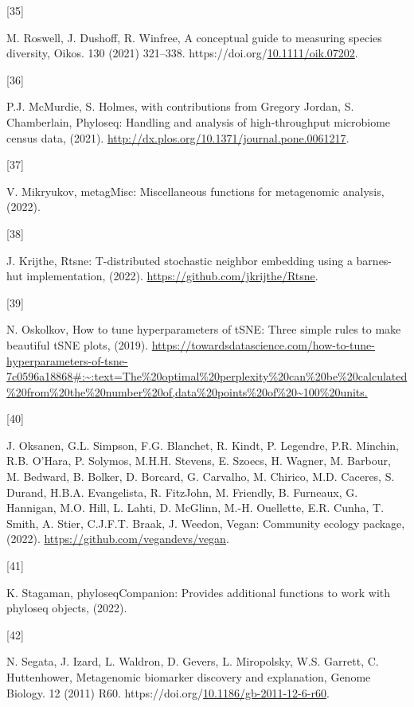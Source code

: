\documentclass[preprint,3p,
a4paper]{elsarticle} %
\newlength{\cslhangindent}
\newlength{\csllabelwidth}
\newlength{\cslentryspacingunit} %
\newenvironment{CSLReferences}[2] %
 {%
  \setlength{\parindent}{0pt}
  \ifodd #1
  \let\oldpar\par
  \def\par{\hangindent=\cslhangindent\oldpar}
  \fi
  \setlength{\parskip}{#2\cslentryspacingunit}
 }%
 {}
\newcommand{\CSLLeftMargin}[1]{\parbox[t]{\csllabelwidth}{#1}}
\newcommand{\CSLRightInline}[1]{\parbox[t]{\linewidth - \csllabelwidth}{#1}\break}
\begin{document}
\begin{CSLReferences}{0}{0}
\leavevmode{}%
\CSLLeftMargin{{[}35{]} }%
\CSLRightInline{M. Roswell, J. Dushoff, R. Winfree, A conceptual guide
to measuring species diversity, Oikos. 130 (2021) 321--338.
https://doi.org/\href{https://doi.org/10.1111/oik.07202}{10.1111/oik.07202}.}

\leavevmode{}%
\CSLLeftMargin{{[}36{]} }%
\CSLRightInline{P.J. McMurdie, S. Holmes, with contributions from
Gregory Jordan, S. Chamberlain, Phyloseq: Handling and analysis of
high-throughput microbiome census data, (2021).
\url{http://dx.plos.org/10.1371/journal.pone.0061217}.}

\leavevmode{}%
\CSLLeftMargin{{[}37{]} }%
\CSLRightInline{V. Mikryukov, metagMisc: Miscellaneous functions for
metagenomic analysis, (2022).}

\leavevmode{}%
\CSLLeftMargin{{[}38{]} }%
\CSLRightInline{J. Krijthe, Rtsne: T-distributed stochastic neighbor
embedding using a barnes-hut implementation, (2022).
\url{https://github.com/jkrijthe/Rtsne}.}

\leavevmode{}%
\CSLLeftMargin{{[}39{]} }%
\CSLRightInline{N. Oskolkov, How to tune hyperparameters of tSNE: Three
simple rules to make beautiful tSNE plots, (2019).
\url{https://towardsdatascience.com/how-to-tune-hyperparameters-of-tsne-7c0596a18868\#:~:text=The\%20optimal\%20perplexity\%20can\%20be\%20calculated\%20from\%20the\%20number\%20of,data\%20points\%20of\%20~100\%20units.}}

\leavevmode{}%
\CSLLeftMargin{{[}40{]} }%
\CSLRightInline{J. Oksanen, G.L. Simpson, F.G. Blanchet, R. Kindt, P.
Legendre, P.R. Minchin, R.B. O'Hara, P. Solymos, M.H.H. Stevens, E.
Szoecs, H. Wagner, M. Barbour, M. Bedward, B. Bolker, D. Borcard, G.
Carvalho, M. Chirico, M.D. Caceres, S. Durand, H.B.A. Evangelista, R.
FitzJohn, M. Friendly, B. Furneaux, G. Hannigan, M.O. Hill, L. Lahti, D.
McGlinn, M.-H. Ouellette, E.R. Cunha, T. Smith, A. Stier, C.J.F.T.
Braak, J. Weedon, Vegan: Community ecology package, (2022).
\url{https://github.com/vegandevs/vegan}.}

\leavevmode{}%
\CSLLeftMargin{{[}41{]} }%
\CSLRightInline{K. Stagaman, phyloseqCompanion: Provides additional
functions to work with phyloseq objects, (2022).}

\leavevmode{}%
\CSLLeftMargin{{[}42{]} }%
\CSLRightInline{N. Segata, J. Izard, L. Waldron, D. Gevers, L.
Miropolsky, W.S. Garrett, C. Huttenhower, Metagenomic biomarker
discovery and explanation, Genome Biology. 12 (2011) R60.
https://doi.org/\href{https://doi.org/10.1186/gb-2011-12-6-r60}{10.1186/gb-2011-12-6-r60}.}


\end{CSLReferences}
\end{document}
